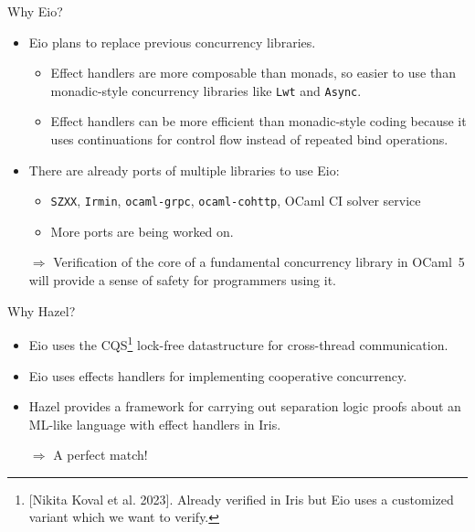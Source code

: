 \documentclass[aspectratio=43]{beamer}
\newcommand{\ocf}{OCaml~5}
\begin{document}
\begin{frame}{Why Eio?}
    \begin{itemize}
        \item Eio plans to replace previous concurrency libraries.
              \begin{itemize}
                  \item Effect handlers are more composable than monads, so easier to use than monadic-style concurrency libraries like \texttt{Lwt} and \texttt{Async}.
                  \item Effect handlers can be more efficient than monadic-style coding because it uses continuations for control flow instead of repeated bind operations.
              \end{itemize}
        \item There are already ports of multiple libraries to use Eio:
              \begin{itemize}
                  \item \texttt{SZXX}, \texttt{Irmin}, \texttt{ocaml-grpc}, \texttt{ocaml-cohttp}, OCaml CI solver service
                  \item More ports are being worked on.
              \end{itemize}
        \item[\(\Rightarrow\)] Verification of the core of a fundamental concurrency library in \ocf{} will provide a sense of safety for programmers using it.
    \end{itemize}
\end{frame}

\begin{frame}{Why Hazel?}
    \begin{itemize}
        \item Eio uses the CQS\footnote{[Nikita Koval et al. 2023]. Already verified in Iris but Eio uses a customized variant which we want to verify.} lock-free datastructure for cross-thread communication.
        \item Eio uses effects handlers for implementing cooperative concurrency.
        \item Hazel provides a framework for carrying out separation logic proofs about an ML-like language with effect handlers in Iris.
        \item[\(\Rightarrow\)] A perfect match!
    \end{itemize}

\end{frame}
\end{document}

